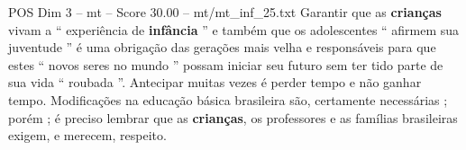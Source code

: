 \begin{textsample}{POS Dim 3 – mt – Score 30.00 – mt/mt\_inf\_25.txt}
Garantir que as \textbf{crianças} vivam a “ experiência de \textbf{infância} ” e também que os adolescentes “ afirmem sua juventude ” é uma obrigação das gerações mais velha e responsáveis para que estes “ novos seres no mundo ” possam iniciar seu futuro sem ter tido parte de sua vida “ roubada ”.
Antecipar muitas vezes é perder tempo e não ganhar tempo.
Modificações na educação básica brasileira são, certamente necessárias ; porém ; é preciso lembrar que as \textbf{crianças}, os professores e as famílias brasileiras exigem, e merecem, respeito.

\end{textsample}
